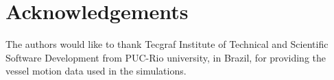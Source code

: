 \section{Acknowledgements}

The authors would like to thank Tecgraf Institute of Technical and Scientific Software Development from PUC-Rio university, in Brazil, for providing the vessel motion data used in the simulations.

